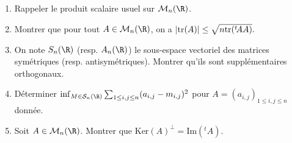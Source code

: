 \documentclass[a4paper,twoside,french,11pt]{VcCours}
\begin{document}
\begin{Exercice}{} \begin{enumerate}
	\item Rappeler le produit scalaire usuel sur ${\cal M}_n(\R)$.
	

\item Montrer que pour tout $A\in{\cal M}_n(\R)$, on a  $|$tr$(A)|\leq \sqrt{n\hbox{tr}(^t\!AA)}.$
	
\item On note $S_n(\R)$ (resp. $A_n(\R)$)	le sous-espace vectoriel des matrices symétriques (resp. antisymétriques). Montrer qu'ils sont supplémentaires orthogonaux.

\item Déterminer $\inf_{M\in{\cal S}_n(\R)}\sum_{1 \leq i,j \leq n}(a_{i,j}-m_{i,j})^2$ pour $A=(a_{i,j})_{1 \leq i,j \leq n}$ donnée.
\item Soit $A\in{\cal M}_n(\R)$. Montrer que $\textrm{Ker}(A)^{\perp}= \textrm{Im}(^t\!A)$.
\end{enumerate}
\end{Exercice}
\end{document}
